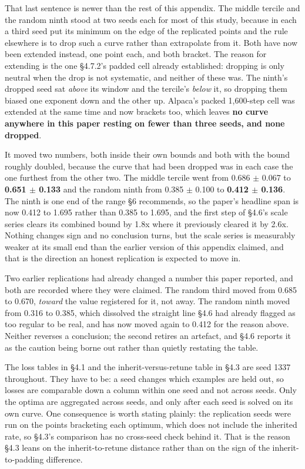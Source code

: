 \documentclass[11pt]{article}
\begin{document}
That last sentence is newer than the rest of this appendix. The middle tercile and the random ninth stood at two seeds each for most of this study, because in each a third seed put its minimum on the edge of the replicated points and the rule elsewhere is to drop such a curve rather than extrapolate from it. Both have now been extended instead, one point each, and both bracket. The reason for extending is the one \S{}4.7.2's padded cell already established: dropping is only neutral when the drop is not systematic, and neither of these was. The ninth's dropped seed sat \emph{above} its window and the tercile's \emph{below} it, so dropping them biased one exponent down and the other up. Alpaca's packed 1,600-step cell was extended at the same time and now brackets too, which leaves \textbf{no curve anywhere in this paper resting on fewer than three seeds, and none dropped}.

It moved two numbers, both inside their own bounds and both with the bound roughly doubled, because the curve that had been dropped was in each case the one furthest from the other two. The middle tercile went from 0.686 $\pm$ 0.067 to \textbf{0.651 $\pm$ 0.133} and the random ninth from 0.385 $\pm$ 0.100 to \textbf{0.412 $\pm$ 0.136}. The ninth is one end of the range \S{}6 recommends, so the paper's headline span is now 0.412 to 1.695 rather than 0.385 to 1.695, and the first step of \S{}4.6's scale series clears its combined bound by 1.8x where it previously cleared it by 2.6x. Nothing changes sign and no conclusion turns, but the scale series is measurably weaker at its small end than the earlier version of this appendix claimed, and that is the direction an honest replication is expected to move in.

Two earlier replications had already changed a number this paper reported, and both are recorded where they were claimed. The random third moved from 0.685 to 0.670, \emph{toward} the value registered for it, not away. The random ninth moved from 0.316 to 0.385, which dissolved the straight line \S{}4.6 had already flagged as too regular to be real, and has now moved again to 0.412 for the reason above. Neither reverses a conclusion; the second retires an artefact, and \S{}4.6 reports it as the caution being borne out rather than quietly restating the table.

The loss tables in \S{}4.1 and the inherit-versus-retune table in \S{}4.3 are seed 1337 throughout. They have to be: a seed changes which examples are held out, so losses are comparable down a column within one seed and not across seeds. Only the optima are aggregated across seeds, and only after each seed is solved on its own curve. One consequence is worth stating plainly: the replication seeds were run on the points bracketing each optimum, which does not include the inherited rate, so \S{}4.3's comparison has no cross-seed check behind it. That is the reason \S{}4.3 leans on the inherit-to-retune distance rather than on the sign of the inherit-to-padding difference.
\end{document}
